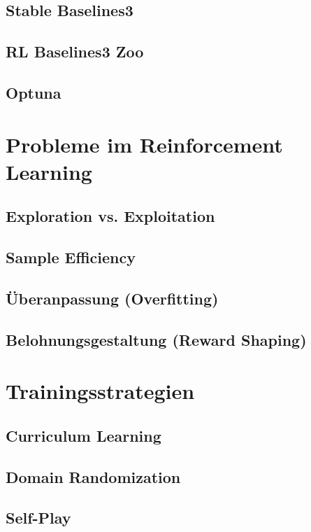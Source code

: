 \subsection{Stable Baselines3}
\subsection{RL Baselines3 Zoo}
\subsection{Optuna}

\section{Probleme im Reinforcement Learning}
\subsection{Exploration vs. Exploitation}
\subsection{Sample Efficiency}
\subsection{Überanpassung (Overfitting)}
\subsection{Belohnungsgestaltung (Reward Shaping)}

\section{Trainingsstrategien}
\subsection{Curriculum Learning}
\subsection{Domain Randomization}
\subsection{Self-Play}

